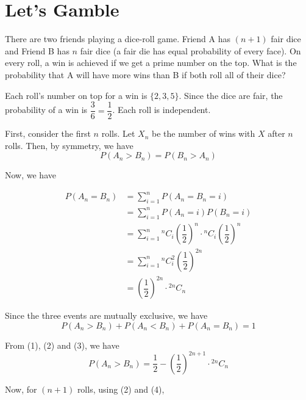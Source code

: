 \documentclass{article}
\newcommand*{\Comb}[2]{{}^{#1}C_{#2}}
\begin{document}
\setcounter{page}{2}
\section{Let's Gamble}

\begin{tcolorbox}
    There are two friends playing a dice-roll game. Friend A has $(n+ 1)$ fair dice and Friend B has $n$
fair dice (a fair die has equal probability of every face). On every roll, a win is achieved if we get a
prime number on the top. What is the probability that A will have more wins than B if both roll
all of their dice? 
\end{tcolorbox}

Each roll's number on top for a win is $\{2, 3, 5\}$. Since the dice are fair, the probability of a win is $\dfrac{3}{6}=\dfrac{1}{2}$. Each roll is independent.

First, consider the first $n$ rolls. Let $X_n$ be the number of wins with $X$ after $n$ rolls. Then, by symmetry, we have
\begin{equation}
    P(A_n>B_n) = P(B_n>A_n)
\end{equation}

Now, we have

\begin{equation}
\begin{aligned}
    P(A_n=B_n) &= \sum_{i=1}^{n}P(A_n=B_n=i) \\
    &= \sum_{i=1}^{n}P(A_n=i)P(B_n=i) \\
    &= \sum_{i=1}^{n} \Comb{n}{i}\left(\dfrac{1}{2}\right)^n\cdot \Comb{n}{i}\left(\dfrac{1}{2}\right)^n \\
    &= \sum_{i=1}^{n} \Comb{n}{i}^2\left(\dfrac{1}{2}\right)^{2n} \\
    &= \left(\dfrac{1}{2}\right)^{2n}\cdot \Comb{2n}{n}
\end{aligned}
\end{equation}

Since the three events are mutually exclusive, we have
\begin{equation}
    P(A_n>B_n) + P(A_n<B_n) + P(A_n=B_n) = 1
\end{equation}

From (1), (2) and (3), we have
\begin{equation}
    P(A_n>B_n) = \dfrac{1}{2} - (\dfrac{1}{2})^{2n+1}\cdot \Comb{2n}{n}
\end{equation}

Now, for $(n+1)$ rolls, using (2) and (4),
\end{document}

